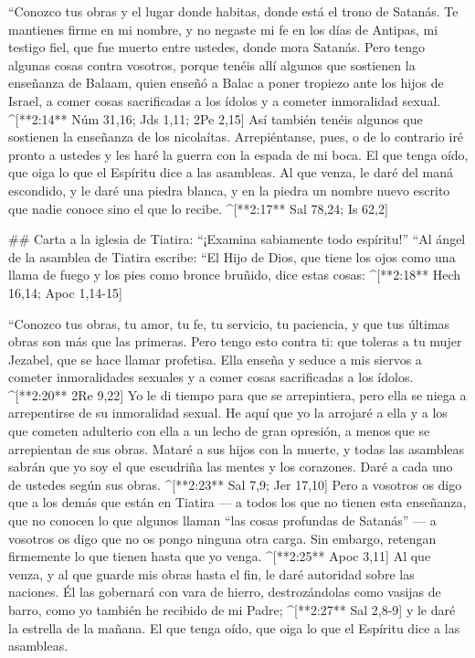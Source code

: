 \begin{paracols}{2}
 “Conozco tus obras y el lugar donde habitas, donde está el trono de Satanás. Te mantienes firme en mi nombre, y no negaste mi fe en los días de Antipas, mi testigo fiel, que fue muerto entre ustedes, donde mora Satanás.  Pero tengo algunas cosas contra vosotros, porque tenéis allí algunos que sostienen la enseñanza de Balaam, quien enseñó a Balac a poner tropiezo ante los hijos de Israel, a comer cosas sacrificadas a los ídolos y a cometer inmoralidad sexual. ^[**2:14** Núm 31,16; Jds 1,11; 2Pe 2,15]  Así también tenéis algunos que sostienen la enseñanza de los nicolaítas.  Arrepiéntanse, pues, o de lo contrario iré pronto a ustedes y les haré la guerra con la espada de mi boca.  El que tenga oído, que oiga lo que el Espíritu dice a las asambleas. Al que venza, le daré del maná escondido, y le daré una piedra blanca, y en la piedra un nombre nuevo escrito que nadie conoce sino el que lo recibe. ^[**2:17** Sal 78,24; Is 62,2]

## Carta a la iglesia de Tiatira: “¡Examina sabiamente todo espíritu!”
 “Al ángel de la asamblea de Tiatira escribe: “El Hijo de Dios, que tiene los ojos como una llama de fuego y los pies como bronce bruñido, dice estas cosas: ^[**2:18** Hech 16,14; Apoc 1,14-15]

 “Conozco tus obras, tu amor, tu fe, tu servicio, tu paciencia, y que tus últimas obras son más que las primeras.  Pero tengo esto contra ti: que toleras a tu mujer Jezabel, que se hace llamar profetisa. Ella enseña y seduce a mis siervos a cometer inmoralidades sexuales y a comer cosas sacrificadas a los ídolos. ^[**2:20** 2Re 9,22]  Yo le di tiempo para que se arrepintiera, pero ella se niega a arrepentirse de su inmoralidad sexual.  He aquí que yo la arrojaré a ella y a los que cometen adulterio con ella a un lecho de gran opresión, a menos que se arrepientan de sus obras.  Mataré a sus hijos con la muerte, y todas las asambleas sabrán que yo soy el que escudriña las mentes y los corazones. Daré a cada uno de ustedes según sus obras. ^[**2:23** Sal 7,9; Jer 17,10]  Pero a vosotros os digo que a los demás que están en Tiatira — a todos los que no tienen esta enseñanza, que no conocen lo que algunos llaman “las cosas profundas de Satanás” — a vosotros os digo que no os pongo ninguna otra carga.  Sin embargo, retengan firmemente lo que tienen hasta que yo venga. ^[**2:25** Apoc 3,11]  Al que venza, y al que guarde mis obras hasta el fin, le daré autoridad sobre las naciones.  Él las gobernará con vara de hierro, destrozándolas como vasijas de barro, como yo también he recibido de mi Padre; ^[**2:27** Sal 2,8-9]  y le daré la estrella de la mañana.  El que tenga oído, que oiga lo que el Espíritu dice a las asambleas. 


\end{paracols}
